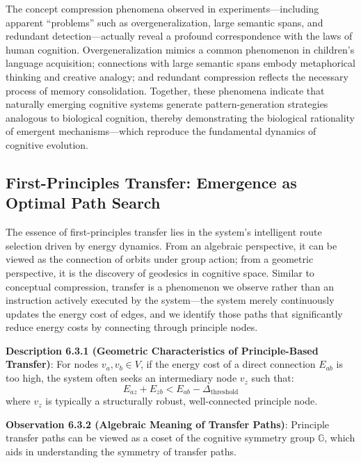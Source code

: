 \documentclass[10pt,onecolumn]{article}
\newcommand{\cognitivegroup}{\mathbb{G}}
\begin{document}
The concept compression phenomena observed in experiments—including apparent “problems” such as overgeneralization, large semantic spans, and redundant detection—actually reveal a profound correspondence with the laws of human cognition. Overgeneralization mimics a common phenomenon in children’s language acquisition; connections with large semantic spans embody metaphorical thinking and creative analogy; and redundant compression reflects the necessary process of memory consolidation. Together, these phenomena indicate that naturally emerging cognitive systems generate pattern-generation strategies analogous to biological cognition, thereby demonstrating the biological rationality of emergent mechanisms—which reproduce the fundamental dynamics of cognitive evolution.

\subsection{First-Principles Transfer: Emergence as Optimal Path Search}

The essence of first-principles transfer lies in the system’s intelligent route selection driven by energy dynamics. From an algebraic perspective, it can be viewed as the connection of orbits under group action; from a geometric perspective, it is the discovery of geodesics in cognitive space. Similar to conceptual compression, transfer is a phenomenon we observe rather than an instruction actively executed by the system—the system merely continuously updates the energy cost of edges, and we identify those paths that significantly reduce energy costs by connecting through principle nodes.

\textbf{Description 6.3.1 (Geometric Characteristics of Principle-Based Transfer)}: For nodes $v_a, v_b \in V$, if the energy cost of a direct connection $E_{ab}$ is too high, the system often seeks an intermediary node $v_z$ such that:
\begin{equation}
E_{az} + E_{zb} < E_{ab} - \Delta_{\text{threshold}}
\end{equation}
where $v_z$ is typically a structurally robust, well-connected principle node.

\textbf{Observation 6.3.2 (Algebraic Meaning of Transfer Paths)}: Principle transfer paths can be viewed as a coset of the cognitive symmetry group $\cognitivegroup$, which aids in understanding the symmetry of transfer paths.
\end{document}

